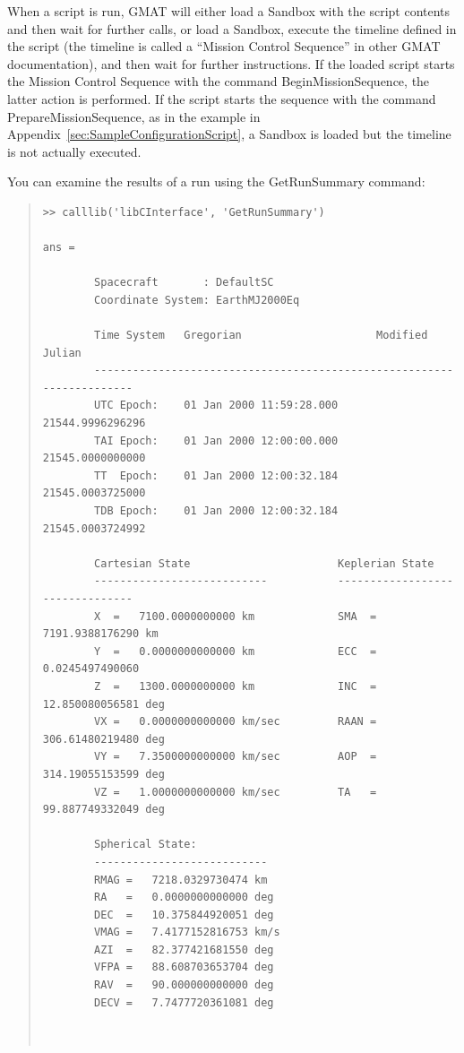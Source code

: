 \documentclass[letterpaper,10pt]{article}
\begin{document}
\noindent When a script is run, GMAT will either load a Sandbox with the script contents and then wait for further calls, or load a Sandbox, execute the timeline defined in the script (the timeline is called a ``Mission Control Sequence'' in other GMAT documentation), and then wait for further instructions.  If the loaded script starts the Mission Control Sequence with the command BeginMissionSequence, the latter action is performed.  If the script starts the sequence with the command PrepareMissionSequence, as in the example in Appendix~\ref{sec:SampleConfigurationScript}, a Sandbox is loaded but the timeline is not actually executed.

You can examine the results of a run using the GetRunSummary command:

\begin{quote}
\begin{verbatim}
>> calllib('libCInterface', 'GetRunSummary')

ans =

        Spacecraft       : DefaultSC
        Coordinate System: EarthMJ2000Eq 

        Time System   Gregorian                     Modified Julian  
        ----------------------------------------------------------------------    
        UTC Epoch:    01 Jan 2000 11:59:28.000      21544.9996296296
        TAI Epoch:    01 Jan 2000 12:00:00.000      21545.0000000000
        TT  Epoch:    01 Jan 2000 12:00:32.184      21545.0003725000
        TDB Epoch:    01 Jan 2000 12:00:32.184      21545.0003724992

        Cartesian State                       Keplerian State
        ---------------------------           -------------------------------- 
        X  =   7100.0000000000 km             SMA  =   7191.9388176290 km
        Y  =   0.0000000000000 km             ECC  =   0.0245497490060
        Z  =   1300.0000000000 km             INC  =   12.850080056581 deg
        VX =   0.0000000000000 km/sec         RAAN =   306.61480219480 deg
        VY =   7.3500000000000 km/sec         AOP  =   314.19055153599 deg
        VZ =   1.0000000000000 km/sec         TA   =   99.887749332049 deg

        Spherical State:
        ---------------------------       
        RMAG =   7218.0329730474 km
        RA   =   0.0000000000000 deg
        DEC  =   10.375844920051 deg
        VMAG =   7.4177152816753 km/s
        AZI  =   82.377421681550 deg
        VFPA =   88.608703653704 deg
        RAV  =   90.000000000000 deg
        DECV =   7.7477720361081 deg



\end{verbatim}
\end{quote}
\end{document}
